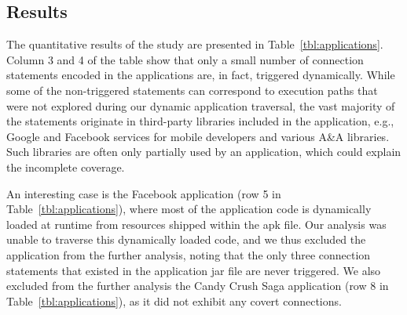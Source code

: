 \subsection{Results}
The quantitative results of the study are presented in %
Table~\ref{tbl:applications}. 
Column 3 and 4 of the table show that only a small number of connection statements encoded in the applications are, in fact, triggered dynamically. 
While some of the non-triggered statements can correspond to execution paths that were not explored during our dynamic application traversal, the vast majority of the statements originate in  
third-party libraries included in the application, e.g., Google and Facebook services for mobile developers and various A\&A libraries. 
Such libraries are often only partially used by an application, which could explain the incomplete coverage.  

An interesting case is the Facebook application (row 5 in Table~\ref{tbl:applications}), where most of the application code is dynamically loaded at runtime from resources shipped within the apk file. 
Our analysis was unable to traverse this dynamically loaded code, and we thus excluded the application from the further analysis, noting that the only three connection statements that existed in the application jar file are never triggered. We also excluded from the further analysis the Candy Crush Saga application (row 8 in Table~\ref{tbl:applications}), as it did not exhibit any covert connections.



